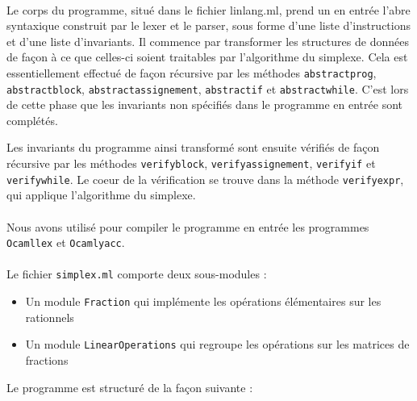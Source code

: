 \documentclass[a4paper]{article}
\begin{document}
\paragraph{}

Le corps du programme, situé dans le fichier linlang.ml, prend un en entrée l'abre syntaxique construit par le lexer et le parser, sous forme d'une liste d'instructions et d'une liste d'invariants. Il commence par transformer les structures de données de façon à ce que celles-ci soient traitables par l'algorithme du simplexe. Cela est essentiellement effectué de façon récursive par les méthodes \texttt{abstract\textunderscore prog}, \texttt{abstract\textunderscore block}, \texttt{abstract\textunderscore assignement}, \texttt{abstract\textunderscore if} et \texttt{abstract\textunderscore while}. C'est lors de cette phase que les invariants non spécifiés dans le programme en entrée sont complétés.

Les invariants du programme ainsi transformé sont ensuite vérifiés de façon récursive par les méthodes \texttt{verify\textunderscore block}, \texttt{verify\textunderscore assignement}, \texttt{verify\textunderscore if} et \texttt{verify\textunderscore while}. Le coeur de la vérification se trouve dans la méthode \texttt{verify\textunderscore expr}, qui applique l'algorithme du simplexe.

\paragraph{}

Nous avons utilisé pour compiler le programme en entrée les programmes \texttt{Ocamllex} et \texttt{Ocamlyacc}.

\paragraph{}

Le fichier \texttt{simplex.ml} comporte deux sous-modules :

\begin{itemize}
  \item Un module \texttt{Fraction} qui implémente les opérations élémentaires sur les rationnels
  \item Un module \texttt{LinearOperations} qui regroupe les opérations sur les matrices de fractions
\end{itemize}

Le programme est structuré de la façon suivante :
\end{document}
